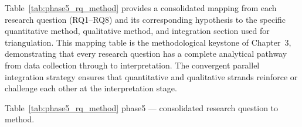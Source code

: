 \vspace{1.5em}

Table~\ref{tab:phase5_rq_method} provides a consolidated mapping from each research question (RQ1--RQ8) and its corresponding hypothesis to the specific quantitative method, qualitative method, and integration section used for triangulation. This mapping table is the methodological keystone of Chapter~3, demonstrating that every research question has a complete analytical pathway from data collection through to interpretation. The convergent parallel integration strategy ensures that quantitative and qualitative strands reinforce or challenge each other at the interpretation stage.

\begingroup\singlespacing\tablefontsize\tablestripes
\noindent Table~\ref{tab:phase5_rq_method} phase5 --- consolidated research question to method.

